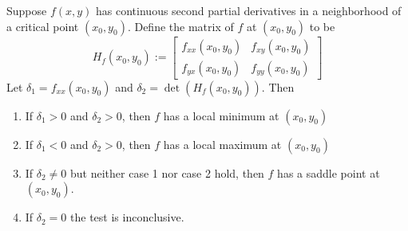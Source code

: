 \begin{appendices}
    \begin{namthm}
        Suppose $f(x,y)$ has continuous second partial derivatives in a neighborhood of a critical point $(x_0,y_0)$. Define the  matrix of $f$ at $(x_0,y_0)$ to be \begin{equation}
            H_f(x_0,y_0) := \begin{bmatrix} f_{xx}(x_0,y_0) & f_{xy}(x_0,y_0) \\ f_{yx}(x_0,y_0) & f_{yy}(x_0,y_0) \end{bmatrix}
        \end{equation}
        Let $\delta_1 = f_{xx}(x_0,y_0)$ and $\delta_2 = \det(H_f(x_0,y_0))$. Then \begin{enumerate}
            \item If $\delta_1 > 0$ and $\delta_2 > 0$, then $f$ has a local minimum at $(x_0,y_0)$
            \item If $\delta_1 < 0$ and $\delta_2 > 0$, then $f$ has a local maximum at $(x_0,y_0)$
            \item If $\delta_2 \neq 0$ but neither case 1 nor case 2 hold, then $f$ has a saddle point at $(x_0,y_0)$.
            \item If $\delta_2 = 0$ the test is inconclusive.
        \end{enumerate}
    \end{namthm}
    

\end{appendices}
